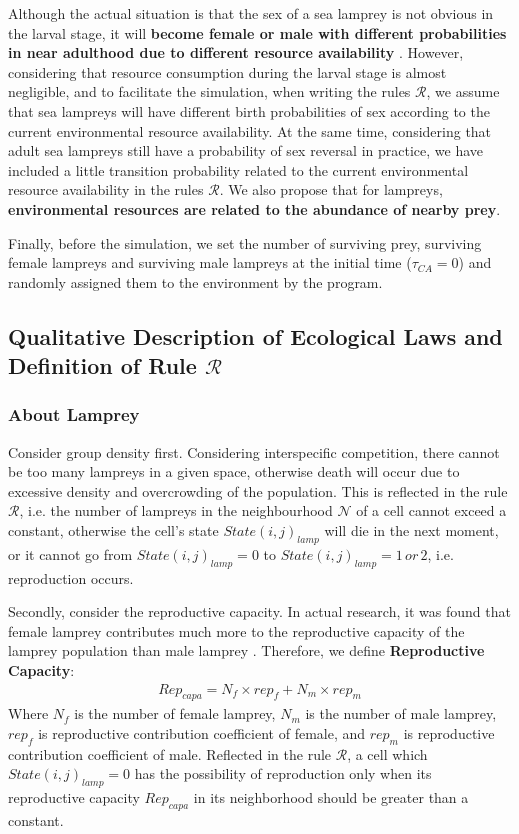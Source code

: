 \documentclass{mcmthesis}
\begin{document}
Although the actual situation is that the sex of a sea lamprey is not obvious in the larval stage, it will \textbf{become female or male with different probabilities in near adulthood due to different resource availability} \cite{7}. However, considering that resource consumption during the larval stage is almost negligible, and to facilitate the simulation, when writing the rules ${\displaystyle {\mathcal {R}}}$, we assume that sea lampreys will have different birth probabilities of sex according to the current environmental resource availability. At the same time, considering that adult sea lampreys still have a probability of sex reversal in practice, we have included a little transition probability related to the current environmental resource availability in the rules ${\displaystyle {\mathcal {R}}}$. We also propose that for lampreys, \textbf{environmental resources are related to the abundance of nearby prey}.

Finally, before the simulation, we set the number of surviving prey, surviving female lampreys and surviving male lampreys at the initial time ($\tau_{CA} = 0$) and randomly assigned them to the environment by the program.

\subsection{Qualitative Description of Ecological Laws and Definition of Rule ${\displaystyle {\mathcal {R}}}$}

\subsubsection{About Lamprey}
Consider group density first. Considering interspecific competition, there cannot be too many lampreys in a given space, otherwise death will occur due to excessive density and overcrowding of the population. This is reflected in the rule ${\displaystyle {\mathcal {R}}}$, i.e. the number of lampreys in the neighbourhood ${\displaystyle {\mathcal {N}}}$ of a cell cannot exceed a constant, otherwise the cell's state $State(i,j)_{lamp}$ will die in the next moment, or it cannot go from $State(i,j)_{lamp}= 0$ to $State(i,j)_{lamp}= 1\,or\,2$, i.e. reproduction occurs.

Secondly, consider the reproductive capacity. In actual research, it was found that female lamprey contributes much more to the reproductive capacity of the lamprey population than male lamprey \cite{2}. Therefore, we define \textbf{Reproductive Capacity}:
\begin{align}
Rep_{capa} = N_f \times rep_f + N_m \times rep_m
\end{align}
 Where $N_f$ is the number of female lamprey, $N_m$ is the number of male lamprey, $rep_f$ is reproductive contribution coefficient of female, and $rep_m$ is reproductive contribution coefficient of male. Reflected in the rule ${\displaystyle {\mathcal {R}}}$, a cell which $State(i,j)_{lamp} = 0$ has the possibility of reproduction only when its reproductive capacity $Rep_{capa}$ in its neighborhood should be greater than a constant.
\end{document}
